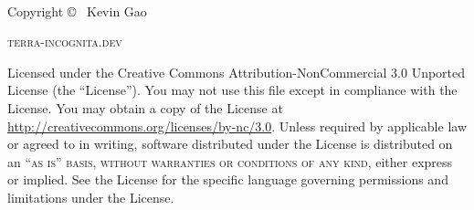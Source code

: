 \documentclass[11pt,fleqn,dvipsnames]{book} %
\begin{document}




\newpage
~\vfill
\thispagestyle{empty}

\noindent Copyright \copyright\ \the\year{} Kevin Gao %

\hfill

\noindent \textsc{terra-incognita.dev} %

\hfill

\noindent Licensed under the Creative Commons Attribution-NonCommercial 3.0 Unported License (the ``License''). You may not use this file except in compliance with the License. You may obtain a copy of the License at \url{http://creativecommons.org/licenses/by-nc/3.0}. Unless required by applicable law or agreed to in writing, software distributed under the License is distributed on an \textsc{``as is'' basis, without warranties or conditions of any kind}, either express or implied. See the License for the specific language governing permissions and limitations under the License.





\pagestyle{empty} %
\usechapterimagefalse
\tableofcontents %

\cleardoublepage %

\pagestyle{fancy} %

\setlength{\parskip}{1em}
\end{document}
